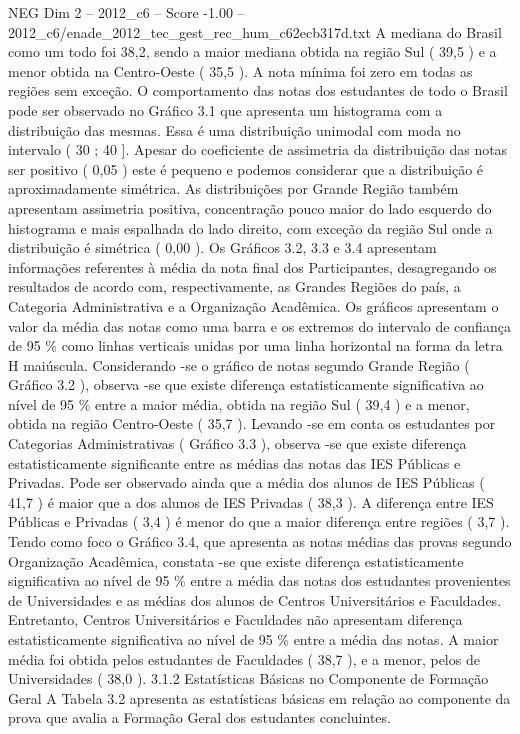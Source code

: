 \begin{textsample}{NEG Dim 2 – 2012\_c6 – Score -1.00 – 2012\_c6/enade\_2012\_tec\_gest\_rec\_hum\_c62ecb317d.txt}
A mediana do Brasil como um todo foi 38,2, sendo a maior mediana obtida na região Sul ( 39,5 ) e a menor obtida na Centro-Oeste ( 35,5 ).
A nota mínima foi zero em todas as regiões sem exceção.
O comportamento das notas dos estudantes de todo o Brasil pode ser observado no Gráfico 3.1 que apresenta um histograma com a distribuição das mesmas.
Essa é uma distribuição unimodal com moda no intervalo ( 30 ; 40 ].
Apesar do coeficiente de assimetria da distribuição das notas ser positivo ( 0,05 ) este é pequeno e podemos considerar que a distribuição é aproximadamente simétrica.
As distribuições por Grande Região também apresentam assimetria positiva, concentração pouco maior do lado esquerdo do histograma e mais espalhada do lado direito, com exceção da região Sul onde a distribuição é simétrica ( 0,00 ).
Os Gráficos 3.2, 3.3 e 3.4 apresentam informações referentes à média da nota final dos Participantes, desagregando os resultados de acordo com, respectivamente, as Grandes Regiões do país, a Categoria Administrativa e a Organização Acadêmica.
Os gráficos apresentam o valor da média das notas como uma barra e os extremos do intervalo de confiança de 95 \% como linhas verticais unidas por uma linha horizontal na forma da letra H maiúscula.
Considerando -se o gráfico de notas segundo Grande Região ( Gráfico 3.2 ), observa -se que existe diferença estatisticamente significativa ao nível de 95 \% entre a maior média, obtida na região Sul ( 39,4 ) e a menor, obtida na região Centro-Oeste ( 35,7 ).
Levando -se em conta os estudantes por Categorias Administrativas ( Gráfico 3.3 ), observa -se que existe diferença estatisticamente significante entre as médias das notas das IES Públicas e Privadas.
Pode ser observado ainda que a média dos alunos de IES Públicas ( 41,7 ) é maior que a dos alunos de IES Privadas ( 38,3 ).
A diferença entre IES Públicas e Privadas ( 3,4 ) é menor do que a maior diferença entre regiões ( 3,7 ).
Tendo como foco o Gráfico 3.4, que apresenta as notas médias das provas segundo Organização Acadêmica, constata -se que existe diferença estatisticamente significativa ao nível de 95 \% entre a média das notas dos estudantes provenientes de Universidades e as médias dos alunos de Centros Universitários e Faculdades.
Entretanto, Centros Universitários e Faculdades não apresentam diferença estatisticamente significativa ao nível de 95 \% entre a média das notas.
A maior média foi obtida pelos estudantes de Faculdades ( 38,7 ), e a menor, pelos de Universidades ( 38,0 ). 3.1.2 Estatísticas Básicas no Componente de Formação Geral A Tabela 3.2 apresenta as estatísticas básicas em relação ao componente da prova que avalia a Formação Geral dos estudantes concluintes.

\end{textsample}
